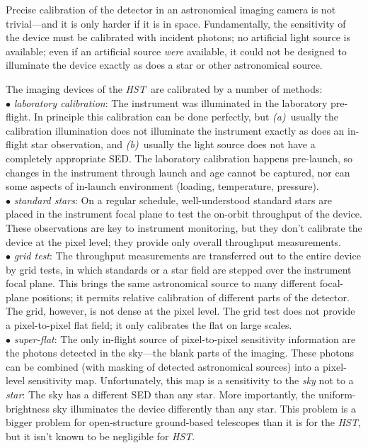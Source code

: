 \documentclass[12pt]{article}
\newcommand{\project}[1]{\textsl{#1}}
\newcommand{\HST}{\project{HST}}
\begin{document}
%
%
\justification          %

Precise calibration of the detector in an astronomical imaging camera
is not trivial---and it is only harder if it is in space.
Fundamentally, the sensitivity of the device must be calibrated with
incident photons; no artificial light source is available; even if an
artificial source \emph{were} available, it could not be designed to
illuminate the device exactly as does a star or other astronomical
source.

The imaging devices of the \HST\ are calibrated by a number of
methods:
\\ $\bullet$ \project{laboratory calibration}: The instrument was illuminated
  in the laboratory pre-flight.  In principle this calibration can be
  done perfectly, but \textsl{(a)}~usually the calibration
  illumination does not illuminate the instrument exactly as does an
  in-flight star observation, and \textsl{(b)}~usually the light
  source does not have a completely appropriate SED.  The laboratory
  calibration happens pre-launch, so changes in the instrument through
  launch and age cannot be captured, nor can some aspects of in-launch
  environment (loading, temperature, pressure).
\\ $\bullet$ \project{standard stars}: On a regular schedule, well-understood
  standard stars are placed in the instrument focal plane to test the
  on-orbit throughput of the device.  These observations are key to
  instrument monitoring, but they don't calibrate the device at the
  pixel level; they provide only overall throughput measurements.
\\ $\bullet$ \project{grid test}: The throughput measurements are transferred
  out to the entire device by grid tests, in which standards or a star
  field are stepped over the instrument focal plane.  This brings the
  same astronomical source to many different focal-plane positions; it
  permits relative calibration of different parts of the detector.
  The grid, however, is not dense at the pixel level.  The grid test
  does not provide a pixel-to-pixel flat field; it only calibrates the
  flat on large scales.
\\ $\bullet$ \project{super-flat}: The only in-flight source of
  pixel-to-pixel sensitivity information are the photons detected in
  the sky---the blank parts of the imaging.  These photons can be
  combined (with masking of detected astronomical sources) into a
  pixel-level sensitivity map.  Unfortunately, this map is a
  sensitivity to the \emph{sky} not to a \emph{star}: The sky has a
  different SED than any star.  More importantly, the
  uniform-brightness sky illuminates the device differently than any
  star.  This problem is a bigger problem for open-structure
  ground-based telescopes than it is for the \HST, but it isn't known
  to be negligible for \HST.
\end{document}
